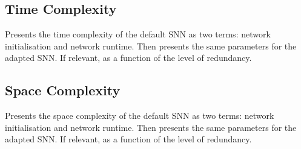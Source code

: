 \subsection{Time Complexity}\label{subsec:time_complexity}
Presents the time complexity of the default SNN as two terms: network initialisation and network runtime. Then presents the same parameters for the adapted SNN. If relevant, as a function of the level of redundancy.

\subsection{Space Complexity}\label{subsec:time_complexity}
Presents the space complexity of the default SNN as two terms: network initialisation and network runtime. Then presents the same parameters for the adapted SNN. If relevant, as a function of the level of redundancy.
